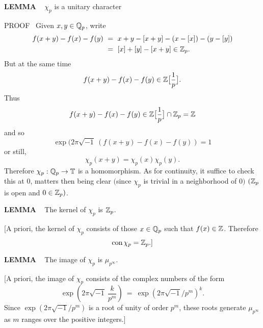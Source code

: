 \begin{x}{\small\bf LEMMA} \ %
$\chi_p$ is a unitary character

\vspace{0.1cm}

PROOF \  Given $x, y \in \mathbb{Q}_p$, write
\begin{align*}
f(x+y) - f(x) - f(y) \ 
&=\  x + y - [x+y] - (x - [x]) - (y - [y]) \\
&=\  [x] + [y] - [x+y] \in \Z_p.
\end{align*}
But at the same time
\[
f(x+y) - f(x) - f(y) \in \mathbb{Z}\bigl[\frac{1}{p}\bigr].
\]
Thus
\[
f(x+y) - f(x) - f(y) \in \mathbb{Z}\bigl[\frac{1}{p}\bigr] \cap \mathbb{Z}_p = \mathbb{Z}
\]
and so
\[
\exp(2\pi \sqrt{-1} \ (f(x + y) - f(x) - f(y)) = 1
\]
or still, 
\[
\chi_p(x + y) = \chi_p(x) \chi_p(y).
\]
Therefore $\chi_p : \mathbb{Q}_p \rightarrow \mathbb{T}$ is a homomorphism.  
As for continuity, it suffice to check this at 0, matters then being clear $($since $\chi_p$ is trivial in a neighborhood of 0$)$ 
$(\mathbb{Z}_p$ is open and $0 \in  \mathbb{Z}_p)$.
\end{x}

\vspace{0.1cm}

\begin{x}{\small\bf LEMMA} \ %
The kernel of $\chi_p$ is $\mathbb{Z}_p$.

\vspace{0.1cm}

[A priori, the kernel of $\chi_p$ consists of those $x \in \mathbb{Q}_p$ such that $f(x) \in \mathbb{Z}$.  
Therefore
\[
\text{con}\hspace{0.05cm}  \chi_p = \mathbb{Z}_p.]
\]
\end{x}

\vspace{0.1cm}

\begin{x}{\small\bf LEMMA} \ %
The image of $\chi_p$ is $\mu_{p^\infty}$.

\vspace{0.1cm}

[A priori, the image of $\chi_p$ consists of the complex numbers of the form
\[
\exp( 2\pi \sqrt{-1} \ \frac{k}{p^m}) \ = \ \exp(2\pi \sqrt{-1}/p^m)^k.
\]
Since $\exp(2\pi \sqrt{-1}/p^m)$ is a root of unity of order $p^m$, these roots generate $\mu_{p^\infty}$ 
as $m$ ranges over the positive integers.]
\end{x}

\vspace{0.1cm}

